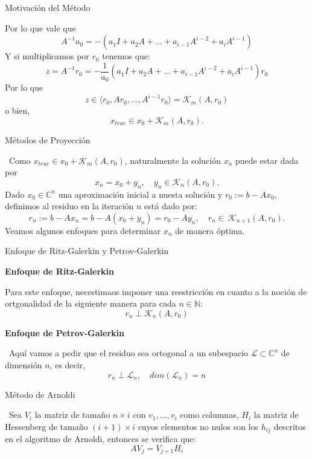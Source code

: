 \documentclass[12pt]{beamer}
\begin{document}
	\begin{frame}{Motivación del Método}
		
		Por lo que vale que $$A^{-1}a_0=-(a_1I+a_2A+\dots+a_{i-1}A^{i-2}+a_iA^{i-1})$$ Y si multiplicamos por $r_0$ tenemos que: $$z=A^{-1}r_0=-\frac{1}{a_0}(a_1I+a_2A+\dots+a_{i-1}A^{i-2}+a_iA^{i-1})r_0$$ Por lo que $$z\in \langle r_0,Ar_0,\dots,A^{i-1}r_0 \rangle = \mathcal{K}_{m}(A, r_0)$$ o bien, $$x_{true} \in x_0 + \mathcal{K}_{m}(A, r_0).$$
		
	\end{frame}
	
	\begin{frame}{Métodos de Proyección}
		
		\ Como $x_{true} \in x_0 + \mathcal{K}_{m}(A, r_0)$, naturalmente la solución $x_n$ puede estar dada por $$x_n = x_0 + y_n, \quad  y_n \in \mathcal{K}_n(A, r_0).$$ Dado $x_0 \in \mathbb{C}^n$ una aproximación inicial a nuesta solución y $r_0 := b - Ax_0$, definimos al residuo en la iteración $n$ está dado por: $$r_n := b - Ax_n = b - A(x_0 + y_n) = r_0 - Ay_n, \quad r_n\in \ \mathcal{K}_{n+1}(A, r_0).$$ Veamos algunos enfoques para determinar $x_n$ de manera óptima.
		
	\end{frame}
	
	\begin{frame}{Enfoque de Ritz-Galerkin y Petrov-Galerkin}
		
		\begin{flushleft}
			\textbf{Enfoque de Ritz-Galerkin}
		\end{flushleft} 
		Para este enfoque, necestimaos imponer una reestricción en cuanto a la noción de ortgonalidad de la siguiente manera para cada $n \in \mathbb{N}$: $$r_n \perp \mathcal{K}_{n}(A, r_0)$$
		
		\begin{flushleft}
			\textbf{Enfoque de Petrov-Galerkin}
		\end{flushleft}
		\ Aquí vamos a pedir que el residuo sea ortogonal a un subespacio $\mathcal{L} \subset \mathbb{C}^{n}$ de dimensión $n$, es decir, 	$$r_n \perp \mathcal{L}_n, \quad dim(\mathcal{L}_n) = n$$
	\end{frame}
	
	\begin{frame}{Método de Arnoldi}
		
		\ Sea $V_i$ la matriz de tamaño $n\times i$ con $v_1, ..., v_i$ como columnas, $H_i$ la matriz de Hessenberg de tamaño $(i+1)\times i$ cuyos elementos no nulos son los $h_{ij}$ descritos en el algoritmo de Arnoldi, entonces se verifica que: $$AV_j=V_{j+1}H_i$$
		
		
		
	\end{frame}
	
\end{document}
